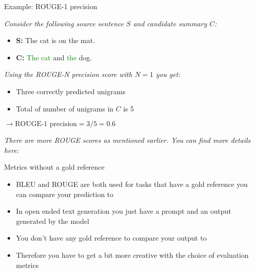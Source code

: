 
\begin{vbframe}{Example: ROUGE-1 precision}

\vfill
\textit{Consider the following source sentence $S$ and candidate summary $C$:}

\hspace{}

\begin{itemize}
    \item \textbf{S:} The cat is on the mat.
    \item \textbf{C:} \textcolor{green}{The cat} and \textcolor{green}{the} dog.
\end{itemize}

\hspace{}

\textit{Using the ROUGE-N precision score with $N = 1$ you get:}

\hspace{}

\begin{itemize}
    \item Three correctly predicted unigrams
    \item Total of number of unigrams in $C$ is 5
\end{itemize}

\hspace{}

$\rightarrow \text{ROUGE-1 precision}=3/5 = 0.6$

\hspace{}

\textit{There are more ROUGE scores as mentioned earlier. You can find more details here:} 
\vfill
    
\end{vbframe}

\begin{vbframe}{Metrics without a gold reference}

\vfill

\begin{itemize}
    \item BLEU and ROUGE are both used for tasks that have a gold reference you can compare your prediction to
    \item In open ended text generation you just have a prompt and an output generated by the model
    \item You don't have any gold reference to compare your output to
    \item Therefore you have to get a bit more creative with the choice of evaluation metrics
\end{itemize}



\vfill
    
\end{vbframe}

